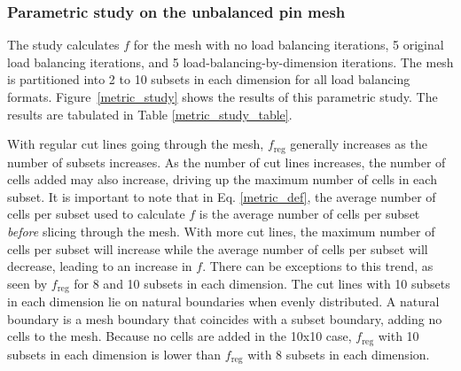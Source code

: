 \documentclass[times,final]{elsarticle}
\begin{document}
\subsubsection{Parametric study on the unbalanced pin mesh}

The study calculates $f$ for the mesh with no load balancing iterations, 5 original load balancing iterations, and 5 load-balancing-by-dimension iterations.
The mesh is partitioned into 2 to 10 subsets in each dimension for all load balancing formats.
Figure~\ref{metric_study} shows the results of this parametric study.
The results are tabulated in Table \ref{metric_study_table}.

With regular cut lines going through the mesh, $f_\text{reg}$ generally increases as the number of subsets increases.
As the number of cut lines increases, the number of cells added may also increase, driving up the maximum number of cells in each subset. 
It is important to note that in Eq. \ref{metric_def}, the average number of cells per subset used to calculate $f$ is the average number of cells per subset \textit{before} slicing through the mesh.
With more cut lines, the maximum number of cells per subset will increase while the average number of cells per subset will decrease, leading to an increase in $f$. There can be exceptions to this trend, as seen by ${f_\text{reg}}$ for 8 and 10 subsets in each dimension.
The cut lines with 10 subsets in each dimension lie on natural boundaries when evenly distributed.
A natural boundary is a mesh boundary that coincides with a subset boundary, adding no cells to the mesh.
Because no cells are added in the 10x10 case, $f_{\text{reg}}$ with 10 subsets in each dimension is lower than $f_{\text{reg}}$ with 8 subsets in each dimension.
\end{document}
